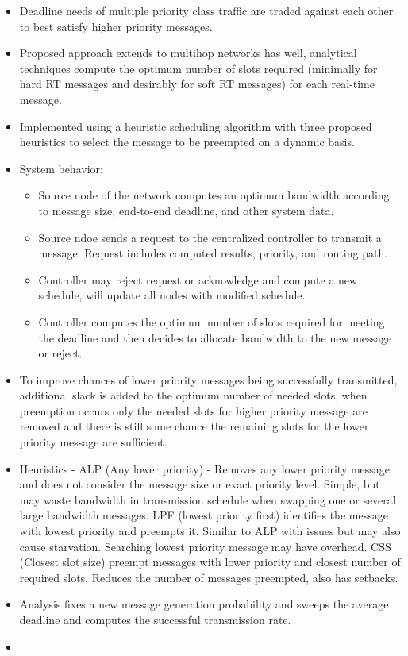 \documentclass{article}
\begin{document}
\begin{itemize}
    \item Deadline needs of multiple priority class traffic are traded against each other to best satisfy higher priority messages.
    \item Proposed approach extends to multihop networks has well, analytical techniques compute the optimum number of slots required (minimally for hard RT messages and desirably for soft RT messages) for each real-time message.
    \item Implemented using a heuristic scheduling algorithm with three proposed heuristics to select the message to be preempted on a dynamic basis.
    \item System behavior:
    \begin{itemize}
        \item Source node of the network computes an optimum bandwidth according to message size, end-to-end deadline, and other system data.
        \item Source ndoe sends a request to the centralized controller to transmit a message.  Request includes computed results, priority, and routing path.
        \item Controller may reject request or acknowledge and compute a new schedule, will update all nodes with modified schedule.
        \item Controller computes the optimum number of slots required for meeting the deadline and then decides to allocate bandwidth to the new message or reject.
    \end{itemize}
    \item To improve chances of lower priority messages being successfully transmitted, additional slack is added to the optimum number of needed slots, when preemption occurs only the needed slots for higher priority message are removed and there is still some chance the remaining slots for the lower priority message are sufficient.
    \item Heuristics - ALP (Any lower priority) - Removes any lower priority message and does not consider the message size or exact priority level. Simple, but may waste bandwidth in transmission schedule when swapping one or several large bandwidth messages.  LPF (lowest priority first) identifies the message with lowest priority and preempts it.  Similar to ALP with issues but may also cause starvation.  Searching lowest priority message may have overhead. CSS (Closest slot size) preempt messages with lower priority and closest number of required slots.  Reduces the number of messages preempted, also has setbacks.
    \item Analysis fixes a new message generation probability and sweeps the average deadline and computes the successful transmission rate.
    \item
\end{itemize}
\end{document}
